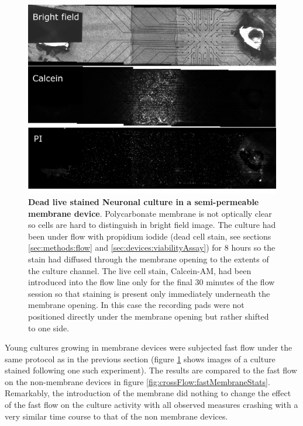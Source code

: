         \begin{figure}[!htb]
            \centering
            \includegraphics[width=15cm]{chapter5/figures/shiftedMembraneImage/shiftedMembrane.jpg}
            \caption[Bright field and staining images of a culture in a cross flow device inclusive of a semi-permeable membrane]{\textbf{Dead live stained Neuronal culture in a semi-permeable membrane device}. Polycarbonate membrane is not optically clear so cells are hard to distinguish in bright field image. The culture had been under flow with propidium iodide (dead cell stain, see sections \ref{sec:methods:flow} and \ref{sec:devices:viabilityAssay}) for 8 hours so the stain had diffused through the membrane opening to the extents of the culture channel. The live cell stain, Calcein-AM, had been introduced into the flow line only for the final 30 minutes of the flow session so that staining is present only immediately underneath the membrane opening. In this case the recording pads were not positioned directly under the membrane opening but rather shifted to one side.}
            \label{fig:crossFlow:shiftedMembrane}
        \end{figure}

        Young cultures growing in membrane devices were subjected fast flow under the same protocol as in the previous section (figure \ref{fig:crossFlow:shiftedMembrane} shows images of a culture stained following one such experiment). The results are compared to the fast flow on the non-membrane devices in figure \ref{fig:crossFlow:fastMembraneStats}. Remarkably, the introduction of the membrane did nothing to change the effect of the fast flow on the culture activity with all observed measures crashing with a very similar time course to that of the non membrane devices.


